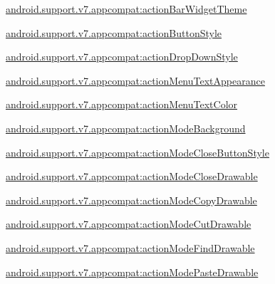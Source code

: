 {\ttfamily \hyperlink{classandroid_1_1support_1_1v7_1_1appcompat_1_1R_1_1styleable_ab810dc14bfe475a34217707ee6129736}{android.\+support.\+v7.\+appcompat\+:action\+Bar\+Widget\+Theme}}

{\ttfamily \hyperlink{classandroid_1_1support_1_1v7_1_1appcompat_1_1R_1_1styleable_aed2e837f0d6e11a7654cf7d92cff7596}{android.\+support.\+v7.\+appcompat\+:action\+Button\+Style}}

{\ttfamily \hyperlink{classandroid_1_1support_1_1v7_1_1appcompat_1_1R_1_1styleable_abba2b1805131f8a438a2d7071f72f61c}{android.\+support.\+v7.\+appcompat\+:action\+Drop\+Down\+Style}}

{\ttfamily \hyperlink{classandroid_1_1support_1_1v7_1_1appcompat_1_1R_1_1styleable_a08537df420a6180fa4bf7a612fafbef4}{android.\+support.\+v7.\+appcompat\+:action\+Menu\+Text\+Appearance}}

{\ttfamily \hyperlink{classandroid_1_1support_1_1v7_1_1appcompat_1_1R_1_1styleable_a7d660534f3eac2be993592cc73cf7d82}{android.\+support.\+v7.\+appcompat\+:action\+Menu\+Text\+Color}}

{\ttfamily \hyperlink{classandroid_1_1support_1_1v7_1_1appcompat_1_1R_1_1styleable_ab3232a346cf79317002a4865cfc6b8bc}{android.\+support.\+v7.\+appcompat\+:action\+Mode\+Background}}

{\ttfamily \hyperlink{classandroid_1_1support_1_1v7_1_1appcompat_1_1R_1_1styleable_a75da0b6bb36190916e35341ab687f5f2}{android.\+support.\+v7.\+appcompat\+:action\+Mode\+Close\+Button\+Style}}

{\ttfamily \hyperlink{classandroid_1_1support_1_1v7_1_1appcompat_1_1R_1_1styleable_ae9cbb0f39b930724e55c613214e2ed19}{android.\+support.\+v7.\+appcompat\+:action\+Mode\+Close\+Drawable}}

{\ttfamily \hyperlink{classandroid_1_1support_1_1v7_1_1appcompat_1_1R_1_1styleable_a956a19fc927aa002ea6418adb5800157}{android.\+support.\+v7.\+appcompat\+:action\+Mode\+Copy\+Drawable}}

{\ttfamily \hyperlink{classandroid_1_1support_1_1v7_1_1appcompat_1_1R_1_1styleable_abc2c7e57c9ef4bef8e58499d58c8e550}{android.\+support.\+v7.\+appcompat\+:action\+Mode\+Cut\+Drawable}}

{\ttfamily \hyperlink{classandroid_1_1support_1_1v7_1_1appcompat_1_1R_1_1styleable_aa802ebe15a40ff9e5965784396ce6a54}{android.\+support.\+v7.\+appcompat\+:action\+Mode\+Find\+Drawable}}

{\ttfamily \hyperlink{classandroid_1_1support_1_1v7_1_1appcompat_1_1R_1_1styleable_a5db0af8493a36e6db8e132914416ea82}{android.\+support.\+v7.\+appcompat\+:action\+Mode\+Paste\+Drawable}}

